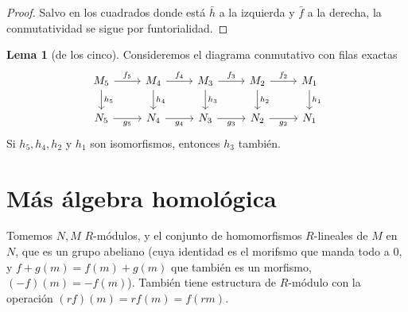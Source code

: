 \documentclass[spanish]{book}
\theoremstyle{definition}
\newtheorem*{lema}{Lema}
\begin{document}
\begin{proof}
	Salvo en los cuadrados donde está $\bar{h}$ a la izquierda y $\bar{f}$ a la derecha, la conmutatividad se sigue por funtorialidad.
\end{proof}
\begin{lema}[de los cinco]
	Consideremos el diagrama conmutativo con filas exactas
	\[\begin{tikzcd}
		M_5\arrow{r}{f_5}\arrow{d}{h_5}&M_4\arrow{r}{f_4}\arrow{d}{h_4}&M_3\arrow{r}{f_3}\arrow{d}{h_3}&M_2\arrow{r}{f_2}\arrow{d}{h_2}&M_1\arrow{d}{h_1}\\
		N_5\arrow[r,swap,"g_5"]&N_4\arrow[r,swap,"g_4"]&N_3\arrow[r,swap,"g_3"]&N_2\arrow[r,swap,"g_2"]&N_1
	\end{tikzcd}\]
	Si $h_5,h_4,h_2$ y $h_1$ son isomorfismos, entonces $h_3$ también.
\end{lema}

\chapter{Más álgebra homológica}
Tomemos $N,M$ $R$-módulos, y el conjunto de homomorfismos $R$-lineales de $M$ en $N$, que es un grupo abeliano (cuya identidad es el morifsmo que manda todo a $0$, y $f+g(m)=f(m)+g(m)$ que también es un morfismo, $(-f)(m)=-f(m)$). También tiene estructura de $R$-módulo con la operación $(rf)(m)=rf(m)=f(rm)$.
\end{document}
